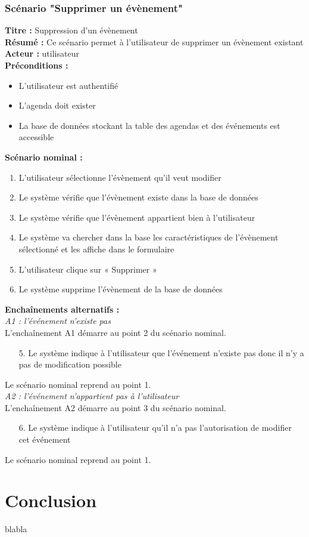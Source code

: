 \documentclass[12pt , a4paper]{article}
\begin{document}
\subsubsection{Scénario "Supprimer un évènement"}
\noindent\textbf{Titre : } Suppression d’un évènement\\
\textbf{Résumé : } Ce scénario permet à l’utilisateur de supprimer un évènement existant\\
\textbf{Acteur : }utilisateur\\

\noindent\textbf{Préconditions :}
\begin{itemize}
\item L’utilisateur est authentifié
\item L'agenda doit exister
\item La base de données stockant la table des agendas et des événements est accessible\\
\end{itemize}


\noindent\textbf{Scénario nominal :}
\begin{enumerate}
\item L’utilisateur sélectionne l’évènement qu’il veut modifier
\item Le système vérifie que l’évènement existe dans la base de données
\item Le système vérifie que l’évènement appartient bien à l’utilisateur
\item Le système va chercher dans la base les caractéristiques de l’évènement sélectionné et les affiche dans le formulaire
\item L’utilisateur clique sur « Supprimer »
\item Le système supprime l’évènement  de la base de données\\
\end{enumerate}

\noindent\textbf{Encha\^inements alternatifs :}\\
\noindent\textit{A1 : l’événement n’existe pas}\\
L'encha\^inement A1 démarre au point 2 du scénario nominal.
\begin{enumerate}
\item[5.] Le système indique à l’utilisateur que l’événement n’existe pas donc il n’y a pas de modification possible
\end{enumerate}
Le scénario nominal reprend au point 1.\\


\noindent\textit{A2 : l’événement n’appartient pas à l’utilisateur}\\
L'encha\^inement A2 démarre au point 3 du scénario nominal.
\begin{enumerate}
\item[6.] Le système indique à l’utilisateur qu’il n’a pas l’autorisation de modifier cet événement
\end{enumerate}
Le scénario nominal reprend au point 1.\\

\newpage	
\section{Conclusion}
blabla
\end{document}
